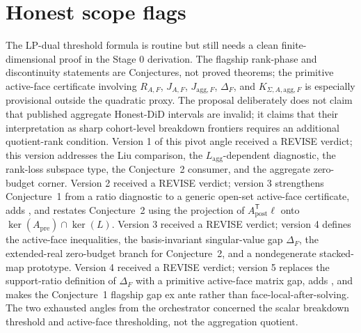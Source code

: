 \documentclass[11pt]{article}
\newcommand{\transpose}{\mathsf{T}}
\theoremstyle{definition}
\theoremstyle{plain}
\theoremstyle{remark}
\begin{document}
\section{Honest scope flags}
The LP-dual threshold formula is routine but still needs a clean finite-dimensional proof in the Stage 0 derivation.
The flagship rank-phase and discontinuity statements are Conjectures, not proved theorems; the primitive active-face certificate involving \(R_{A,F}\), \(J_{A,F}\), \(J_{\mathrm{agg},F}\), \(\Delta_F\), and \(K_{\Sigma,A,\mathrm{agg},F}\) is especially provisional outside the quadratic proxy.
The proposal deliberately does not claim that published aggregate Honest-DiD intervals are invalid; it claims that their interpretation as sharp cohort-level breakdown frontiers requires an additional quotient-rank condition.
Version 1 of this pivot angle received a REVISE verdict; this version addresses the Liu comparison, the \(L_{\mathrm{agg}}\)-dependent diagnostic, the rank-loss subspace type, the Conjecture~2 consumer, and the aggregate zero-budget corner.
Version 2 received a REVISE verdict; version 3 strengthens Conjecture~1 from a ratio diagnostic to a generic open-set active-face certificate, adds \citet{callaway2023nonparallel}, and restates Conjecture~2 using the projection of \(A_{\mathrm{post}}^\transpose\ell\) onto \(\ker(A_{\mathrm{pre}})\cap\ker(L)\).
Version 3 received a REVISE verdict; version 4 defines the active-face inequalities, the basis-invariant singular-value gap \(\Delta_F\), the extended-real zero-budget branch for Conjecture~2, and a nondegenerate stacked-map prototype.
Version 4 received a REVISE verdict; version 5 replaces the support-ratio definition of \(\Delta_F\) with a primitive active-face matrix gap, adds \citet{wright2026designrobust}, and makes the Conjecture~1 flagship gap ex ante rather than face-local-after-solving.
The two exhausted angles from the orchestrator concerned the scalar breakdown threshold and active-face thresholding, not the aggregation quotient.
\end{document}
